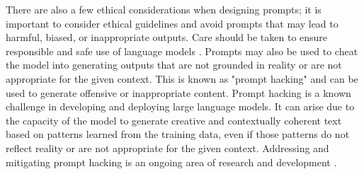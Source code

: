 
There are also a few ethical considerations when designing prompts; it is important to consider ethical guidelines and avoid prompts that may lead to harmful, biased, or inappropriate outputs. Care should be taken to ensure responsible and safe use of language models \cite{li2023ethics,kasneci2023chatgpt}. Prompts may also be used to cheat the model into generating outputs that are not grounded in reality or are not appropriate for the given context. This is known as "prompt hacking" and can be used to generate offensive or inappropriate content. Prompt hacking is a known challenge in developing and deploying large language models. It can arise due to the capacity of the model to generate creative and contextually coherent text based on patterns learned from the training data, even if those patterns do not reflect reality or are not appropriate for the given context. Addressing and mitigating prompt hacking is an ongoing area of research and development \cite{greshake2023more,secretsydney,ignore-all-previous-instructions}.